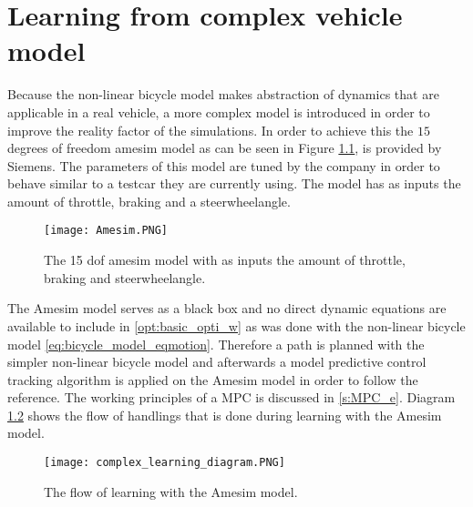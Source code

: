 \chapter{Learning from complex vehicle model}
\label{cha:Tracking_MPC}


Because the non-linear bicycle model makes abstraction of dynamics that are applicable in a real vehicle, a more complex model is introduced in order to improve the reality factor of the simulations. In order to achieve this the $15$ degrees of freedom amesim model as can be seen in Figure \ref{fig:Amesim}, is provided by Siemens. The parameters of this model are tuned by the company in order to behave similar to a testcar they are currently using. The model has as inputs the amount of throttle, braking and a steerwheelangle.  

\begin{figure}[h!]
	\centering
	\texttt{[image: Amesim.PNG]}
	\caption{The 15 dof amesim model with as inputs the amount of throttle, braking and steerwheelangle.}	
	\label{fig:Amesim}
\end{figure}

The Amesim model serves as a black box and no direct dynamic equations are available 
to include in \ref{opt:basic_opti_w} as was done with the non-linear bicycle model \ref{eq:bicycle_model_eqmotion}. Therefore a path is planned with the simpler non-linear bicycle model and afterwards a model predictive control tracking algorithm is applied on the Amesim model in order to follow the reference. The working principles of a MPC is discussed in \ref{s:MPC_e}. Diagram \ref{fig:complex_learning} shows the flow of handlings that is done during learning with the Amesim model.

\begin{figure}[h!]
	\centering
	\texttt{[image: complex\_learning\_diagram.PNG]}
	\caption{The flow of learning with the Amesim model.}	
	\label{fig:complex_learning}
\end{figure}

